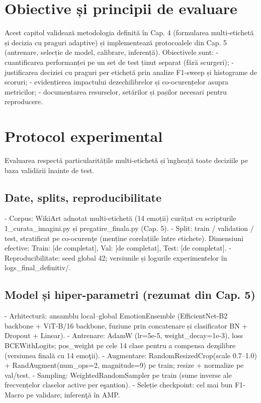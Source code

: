 \section{Obiective și principii de evaluare}
Acest capitol validează metodologia definită în Cap. 4 (formularea multi-etichet\u{a} și decizia cu praguri adaptive) și implementează protocoalele din Cap. 5 (antrenare, selecție de model, calibrare, inferență). Obiectivele sunt:
- cuantificarea performanței pe un set de test ținut separat (fără scurgeri);
- justificarea deciziei cu praguri per etichetă prin analize F1-sweep și histograme de scoruri;
- evidențierea impactului dezechilibrelor și co-ocurențelor asupra metricilor;
- documentarea resurselor, setărilor și pașilor necesari pentru reproducere.

\section{Protocol experimental}
Evaluarea respectă particularitățile multi-etichet\u{a} și \^{\i}ngheață toate deciziile pe baza validării înainte de test.

\subsection{Date, splits, reproducibilitate}
- Corpus: WikiArt adnotat multi-etichet\u{a} (14 emoții) curățat cu scripturile 1\_curata\_imagini.py și pregatire\_finala.py (Cap. 5).
- Split: train / validation / test, stratificat pe co-ocuren\c{t}e (menține corelațiile între etichete). Dimensiuni efective: Train: [de completat], Val: [de completat], Test: [de completat].
- Reproducibilitate: seed global 42; versiunile și logurile experimentelor în logs\_final\_definitiv/.

\subsection{Model și hiper-parametri (rezumat din Cap. 5)}
- Arhitectură: ansamblu local–global EmotionEnsemble (EfficientNet-B2 backbone + ViT-B/16 backbone, fuziune prin concatenare și clasificator BN + Dropout + Linear).
- Antrenare: AdamW (lr=5e-5, weight\_decay=1e-3), loss BCEWithLogits; pos\_weight pe cele 14 clase pentru a compensa dez\c{s}ilibre (versiunea final\u{a} cu 14 emo\c{t}ii).
- Augmentare: RandomResizedCrop(scale 0.7–1.0) + RandAugment(num\_ops=2, magnitude=9) pe train; resize + normalize pe val/test.
- Sampling: WeightedRandomSampler pe train (sume inverse ale frecvențelor claselor active per e\c{s}antion).
- Seleție checkpoint: cel mai bun F1-Macro pe validare; inferen\c{t}\u{a} în AMP.

